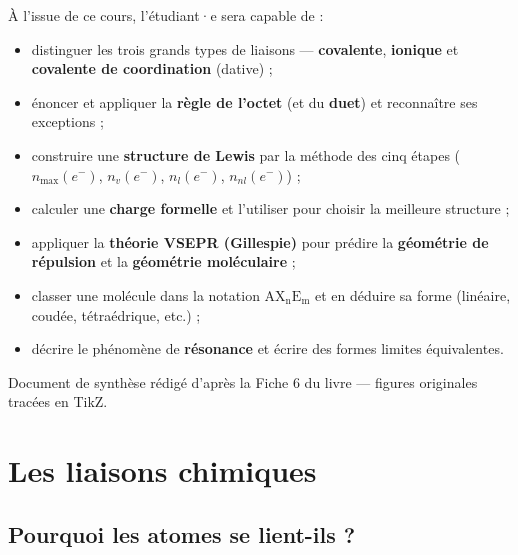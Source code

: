 \documentclass[11pt,a4paper]{article}
\newcommand{\nmax}{n_{\max}(e^{-})}
\newcommand{\nv}{n_{v}(e^{-})}
\newcommand{\nl}{n_{l}(e^{-})}
\newcommand{\nnl}{n_{nl}(e^{-})}
\newcommand{\AX}[2]{\ensuremath{\mathrm{AX_{#1}E_{#2}}}}
\begin{document}
\begin{tcolorbox}[boxbase,colback=primary!5,colframe=primary,width=15.2cm,
    title={\textsc{Objectifs pédagogiques de la fiche}}]
À l'issue de ce cours, l'étudiant·e sera capable de :
\begin{itemize}[leftmargin=1.6em,topsep=2pt,itemsep=1pt]
  \item distinguer les trois grands types de liaisons — \textbf{covalente},
        \textbf{ionique} et \textbf{covalente de coordination} (dative) ;
  \item énoncer et appliquer la \textbf{règle de l'octet} (et du \textbf{duet}) et reconnaître ses exceptions ;
  \item construire une \textbf{structure de Lewis} par la méthode des cinq étapes
        ($\nmax$, $\nv$, $\nl$, $\nnl$) ;
  \item calculer une \textbf{charge formelle} et l'utiliser pour choisir la meilleure structure ;
  \item appliquer la \textbf{théorie VSEPR (Gillespie)} pour prédire la \textbf{géométrie de répulsion} et la \textbf{géométrie moléculaire} ;
  \item classer une molécule dans la notation \AX{n}{m} et en déduire sa forme (linéaire, coudée, tétraédrique, etc.) ;
  \item décrire le phénomène de \textbf{résonance} et écrire des formes limites équivalentes.
\end{itemize}
\end{tcolorbox}

\vspace{0.35cm}
{\small\color{black!60} Document de synthèse rédigé d'après la Fiche 6 du livre — figures originales tracées en TikZ.}
\par
\endgroup

\newpage
\renewcommand{\contentsname}{\textcolor{primarydark}{Table des matières}}
\tableofcontents
\thispagestyle{fancy}
\newpage

\section{Les liaisons chimiques}

\subsection{Pourquoi les atomes se lient-ils ?}
\end{document}
